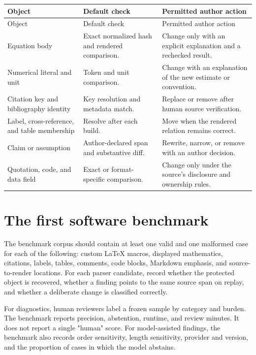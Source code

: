 \begin{longtable}{@{}p{}p{}p{}@{}}
\toprule
Object & Default check & Permitted author action \\
\midrule
\endfirsthead
\toprule
Object & Default check & Permitted author action \\
\midrule
\endhead
Equation body & Exact normalized hash and rendered comparison. & Change only
with an explicit explanation and a rechecked result. \\
Numerical literal and unit & Token and unit comparison. & Change with an
explanation of the new estimate or convention. \\
Citation key and bibliography identity & Key resolution and metadata match. &
Replace or remove after human source verification. \\
Label, cross-reference, and table membership & Resolve after each build. &
Move when the rendered relation remains correct. \\
Claim or assumption & Author-declared span and substantive diff. & Rewrite,
narrow, or remove with an author decision. \\
Quotation, code, and data field & Exact or format-specific comparison. &
Change only under the source's disclosure and ownership rules. \\
\bottomrule
\end{longtable}

\section{The first software benchmark}

The benchmark corpus should contain at least one valid and one malformed case
for each of the following: custom LaTeX macros, displayed mathematics,
citations, labels, tables, comments, code blocks, Markdown emphasis, and
source-to-render locations. For each parser candidate, record whether the
protected object is recovered, whether a finding points to the same source
span on replay, and whether a deliberate change is classified correctly.

For diagnostics, human reviewers label a frozen sample by category and burden.
The benchmark reports precision, abstention, runtime, and review minutes. It
does not report a single "human" score. For model-assisted findings, the
benchmark also records order sensitivity, length sensitivity, provider and
version, and the proportion of cases in which the model abstains.

